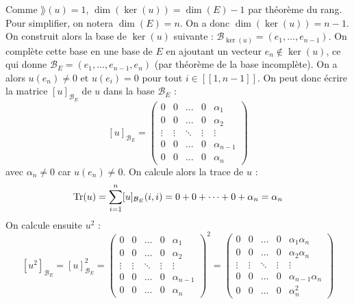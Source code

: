 \documentclass[11pt,a4paper]{report}
\begin{document}
\begin{correction}
    Comme $\rang(u) = 1$, $\dim(\ker(u)) = \dim(E) - 1$ par théorème du rang. Pour simplifier, on notera $\dim(E) = n$. On a donc $\dim(\ker(u)) = n - 1$. On construit alors la base de $\ker(u)$ suivante : $\mathcal B_{\ker(u)} = (e_1, \dots, e_{n-1})$. On complète cette base en une base de $E$ en ajoutant un vecteur $e_n \notin \ker(u)$, ce qui donne $\mathcal B_E = (e_1, \dots, e_{n-1}, e_n)$ (par théorème de la base incomplète). On a alors $u(e_n) \neq 0$ et $u(e_i) = 0$ pour tout $i \in [\![1, n-1]\!]$. On peut donc écrire la matrice $[u]_{\mathcal B_E}$ de $u$ dans la base $\mathcal B_E$ :
    \[
        [u]_{\mathcal B_E} = \begin{pmatrix}
            0 & 0 & \dots & 0 & \alpha_1 \\
            0 & 0 & \dots & 0 & \alpha_2 \\
            \vdots & \vdots & \ddots & \vdots & \vdots \\
            0 & 0 & \dots & 0 & \alpha_{n-1} \\
            0 & 0 & \dots & 0 & \alpha_n
        \end{pmatrix}
    \]
    avec $\alpha_n \neq 0$ car $u(e_n) \neq 0$. On calcule alors la trace de $u$ :
    \[
        \mathrm{Tr}(u) = \sum_{i=1}^n [u]_{\mathcal B_E}(i,i) = 0 + 0 + \dots + 0 + \alpha_n = \alpha_n
    \]
    On calcule ensuite $u^2$ :
    \[
        [u^2]_{\mathcal B_E} = [u]_{\mathcal B_E}^2 = \begin{pmatrix}
            0 & 0 & \dots & 0 & \alpha_1 \\
            0 & 0 & \dots & 0 & \alpha_2 \\
            \vdots & \vdots & \ddots & \vdots & \vdots \\
            0 & 0 & \dots & 0 & \alpha_{n-1} \\
            0 & 0 & \dots & 0 & \alpha_n
        \end{pmatrix}^2 = 
        \begin{pmatrix}
            0 & 0 & \dots & 0 & \alpha_1 \alpha_n \\
            0 & 0 & \dots & 0 & \alpha_2 \alpha_n \\
            \vdots & \vdots & \ddots & \vdots & \vdots \\
            0 & 0 & \dots & 0 & \alpha_{n-1} \alpha_n \\
            0 & 0 & \dots & 0 & \alpha_n^2 
        \end{pmatrix}
\]
\end{correction}
\end{document}
